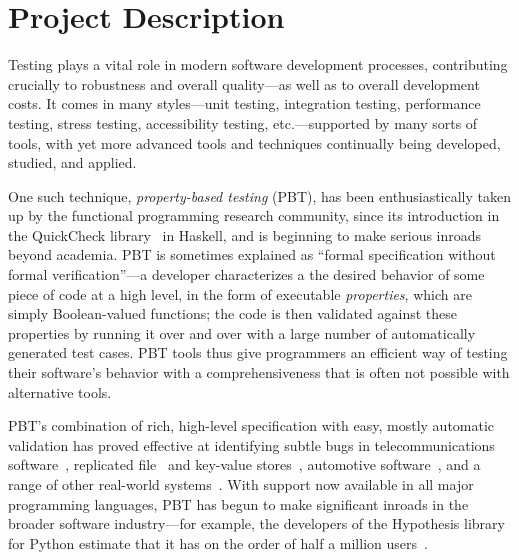 \section*{Project Description}



\iflater{}\fi

Testing plays a vital role in modern software development processes,
contributing crucially to robustness and overall quality---as well as
to overall development costs.
%
It comes in many styles---unit testing, integration testing,
performance testing, stress testing, accessibility testing,
etc.---supported by many sorts of tools, with yet more advanced tools
and techniques continually being developed, studied, and applied.

One such technique, {\em property-based testing} (PBT), has been
enthusiastically taken up by the functional programming research
community, since its introduction in the QuickCheck
library~\cite{ClaessenHughes00} in Haskell, and is beginning to make
serious inroads beyond academia.
%
PBT is sometimes explained as ``formal specification without formal
verification''---a developer characterizes a the desired behavior of
some piece of code at a high level, in the form of executable {\em
  properties}, which are simply Boolean-valued functions; the code is
then validated against these properties by running it over and over
with a large number of automatically generated test cases.
%
PBT tools thus give programmers an efficient way of testing their
software's behavior with a comprehensiveness that is often not
possible with alternative tools.

PBT's combination of rich, high-level specification with easy, mostly
automatic validation has proved effective at identifying subtle
bugs in telecommunications software~\cite{arts2006testing}, replicated
file~\cite{hughes2014mysteries} and key-value
stores~\cite{Bornholt2021}, automotive software~\cite{arts2015testing}, and a range
of other real-world systems~\cite{hughes2016experiences}. With support
now available in all major programming languages, PBT has
begun to make significant inroads in the broader software
industry---for example, the developers of the Hypothesis library for
Python estimate that it has on the order of half a million
users~\cite{ZacPersonalCommunication}.

